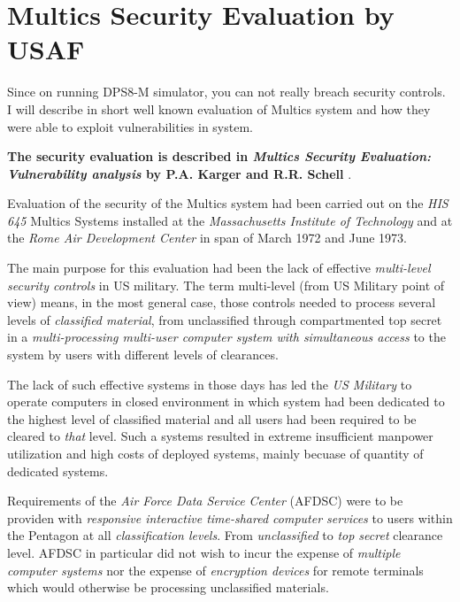 


\section{Multics Security Evaluation by USAF}

Since on running DPS8-M simulator, you can not really breach security controls. I will describe in short well known evaluation of 
Multics system and how they were able to exploit vulnerabilities in system. 

\textbf{The security evaluation is described in \textit{Multics Security Evaluation: Vulnerability analysis} by P.A. Karger and R.R. Schell} \cite{AnalysisKargerSchell}.

Evaluation of the security of the Multics system had been carried out on the \textit{HIS 645} 
Multics Systems installed at the \textit{Massachusetts Institute of Technology} and at the 
\textit{Rome Air Development Center} in span of March 1972 and June 1973.

The main purpose for this evaluation had been the lack of effective \textit{multi-level security controls}
in US military. The term multi-level (from US Military point of view) means, in the most general case, 
those controls needed to process several levels of \textit{classified material}, from unclassified 
through compartmented top secret in a \textit{multi-processing multi-user computer system with simultaneous 
access} to the system by users with different levels of clearances.

The lack of such effective systems in those days has led the \textit{US Military} to operate computers
in closed environment in which system had been dedicated to the highest level of classified material and
all users had been required to be cleared to \textit{that} level.
Such a systems resulted in extreme insufficient manpower utilization and high costs of deployed systems,
mainly becuase of quantity of dedicated systems. 

Requirements of the \textit{Air Force Data Service Center} (AFDSC) were to be providen with 
\textit{responsive interactive time-shared computer services} to users within the Pentagon
at all \textit{classification levels}. From \textit{unclassified} to \textit{top secret} clearance level.
AFDSC in particular did not wish to incur the expense of \textit{multiple computer systems} nor the expense of 
\textit{encryption devices} for remote terminals which would otherwise be processing unclassified materials.

